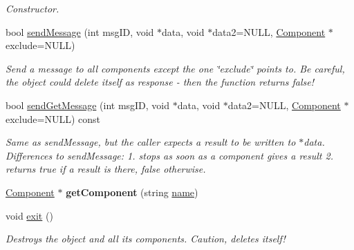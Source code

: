 \begin{DoxyCompactItemize}
\begin{DoxyCompactList}\small\item\em \-Constructor. \end{DoxyCompactList}\item 
\hypertarget{classObject_a3db4f59a78c5efe2c9beb73a6d976592}{
bool \hyperlink{classObject_a3db4f59a78c5efe2c9beb73a6d976592}{send\-Message} (int msg\-I\-D, void $\ast$data, void $\ast$data2=\-N\-U\-L\-L, \hyperlink{classComponent}{\-Component} $\ast$exclude=\-N\-U\-L\-L)}
\label{d8/d4b/classObject_a3db4f59a78c5efe2c9beb73a6d976592}

\begin{DoxyCompactList}\small\item\em \-Send a message to all components except the one \char`\"{}exclude\char`\"{} points to. \-Be careful, the object could delete itself as response -\/ then the function returns false! \end{DoxyCompactList}\item 
\hypertarget{classObject_a96d2fd2a5b913832dd01ed7bb94d6bee}{
bool \hyperlink{classObject_a96d2fd2a5b913832dd01ed7bb94d6bee}{send\-Get\-Message} (int msg\-I\-D, void $\ast$data, void $\ast$data2=\-N\-U\-L\-L, \hyperlink{classComponent}{\-Component} $\ast$exclude=\-N\-U\-L\-L) const }
\label{d8/d4b/classObject_a96d2fd2a5b913832dd01ed7bb94d6bee}

\begin{DoxyCompactList}\small\item\em \-Same as send\-Message, but the caller expects a result to be written to $\ast$data. \-Differences to send\-Message\-: 1. stops as soon as a component gives a result 2. returns true if a result is there, false otherwise. \end{DoxyCompactList}\item 
\hypertarget{classObject_aad9150d0a134febaa6cb645fc6f0f81b}{
\hyperlink{classComponent}{\-Component} $\ast$ {\bfseries get\-Component} (string \hyperlink{classObject_af849c7778ff8399ac4440062ac5a38a3}{name})}
\label{d8/d4b/classObject_aad9150d0a134febaa6cb645fc6f0f81b}

\item 
\hypertarget{classObject_abebc48ad87f55931b69a9e1e1dd8ff2f}{
void \hyperlink{classObject_abebc48ad87f55931b69a9e1e1dd8ff2f}{exit} ()}
\label{d8/d4b/classObject_abebc48ad87f55931b69a9e1e1dd8ff2f}

\begin{DoxyCompactList}\small\item\em \-Destroys the object and all its components. \-Caution, deletes itself! \end{DoxyCompactList}\end{DoxyCompactItemize}
